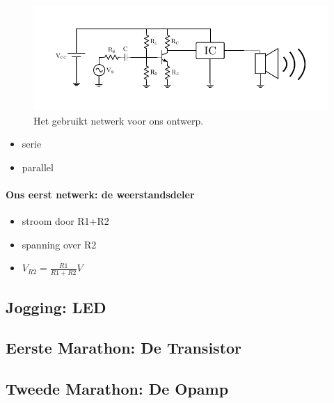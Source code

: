 \documentclass{article}
\begin{document}
\begin{figure}[htbp]
	\centering
	\includegraphics[width=\textwidth]{volledig_schema}
	\caption{Het gebruikt netwerk voor ons ontwerp.}
	\label{fig:volledig_schema}
\end{figure}





\begin{itemize}
	\item serie
	\item parallel
\end{itemize}

\paragraph*{Ons eerst netwerk: de weerstandsdeler}

\begin{itemize}
	\item stroom door R1+R2
	\item spanning over R2
	\item $V_{R2} = \frac{R1}{R1+R2}V$
\end{itemize}
\subsection{Jogging: LED}
\subsection{Eerste Marathon: De Transistor}
\subsection{Tweede Marathon: De Opamp}
\end{document}
